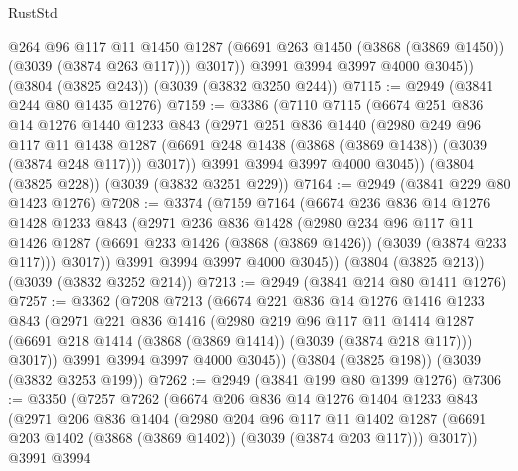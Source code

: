\begin{lexlean}{RustStd}
\begin{coremodule}
            @264
            @96
            @117
            @11
            @1450
            @1287
            (@6691 @263 @1450 (@3868 (@3869 @1450)) (@3039 (@3874 @263 @117)))
            @3017))
        @3991
        @3994
        @3997
        @4000
        @3045))
    (@3804 (@3825 @243))
    (@3039 (@3832 @3250 @244))
@7115 := @2949 (@3841 @244 @80 @1435 @1276)
@7159 := @3386
    (@7110
      @7115
      (@6674
        @251
        @836
        @14
        @1276
        @1440
        @1233
        @843
        (@2971
          @251
          @836
          @1440
          (@2980
            @249
            @96
            @117
            @11
            @1438
            @1287
            (@6691 @248 @1438 (@3868 (@3869 @1438)) (@3039 (@3874 @248 @117)))
            @3017))
        @3991
        @3994
        @3997
        @4000
        @3045))
    (@3804 (@3825 @228))
    (@3039 (@3832 @3251 @229))
@7164 := @2949 (@3841 @229 @80 @1423 @1276)
@7208 := @3374
    (@7159
      @7164
      (@6674
        @236
        @836
        @14
        @1276
        @1428
        @1233
        @843
        (@2971
          @236
          @836
          @1428
          (@2980
            @234
            @96
            @117
            @11
            @1426
            @1287
            (@6691 @233 @1426 (@3868 (@3869 @1426)) (@3039 (@3874 @233 @117)))
            @3017))
        @3991
        @3994
        @3997
        @4000
        @3045))
    (@3804 (@3825 @213))
    (@3039 (@3832 @3252 @214))
@7213 := @2949 (@3841 @214 @80 @1411 @1276)
@7257 := @3362
    (@7208
      @7213
      (@6674
        @221
        @836
        @14
        @1276
        @1416
        @1233
        @843
        (@2971
          @221
          @836
          @1416
          (@2980
            @219
            @96
            @117
            @11
            @1414
            @1287
            (@6691 @218 @1414 (@3868 (@3869 @1414)) (@3039 (@3874 @218 @117)))
            @3017))
        @3991
        @3994
        @3997
        @4000
        @3045))
    (@3804 (@3825 @198))
    (@3039 (@3832 @3253 @199))
@7262 := @2949 (@3841 @199 @80 @1399 @1276)
@7306 := @3350
    (@7257
      @7262
      (@6674
        @206
        @836
        @14
        @1276
        @1404
        @1233
        @843
        (@2971
          @206
          @836
          @1404
          (@2980
            @204
            @96
            @117
            @11
            @1402
            @1287
            (@6691 @203 @1402 (@3868 (@3869 @1402)) (@3039 (@3874 @203 @117)))
            @3017))
        @3991
        @3994

\end{coremodule}
\end{lexlean}
